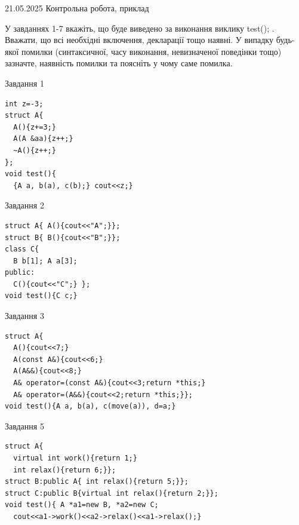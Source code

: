 \documentclass[12pt, ukrainian]{article}
\begin{document}
{{21.05.2025 Контрольна робота, приклад } \par}
{
У завданнях 1-7 вкажіть, що буде виведено за виконання виклику test(); . 
    Вважати, що всі необхідні включення, декларації тощо наявні. 
    У випадку будь-якої помилки (синтаксичної, часу виконання, невизначеної поведінки тощо) зазначте, наявність помилки та поясніть у чому саме помилка.
\begin{minipage}[t]{11cm}
               
{\begin{center}Завдання {1}\end{center}}
\vspace{-6mm}

\begin{verbatim}
int z=-3;
struct A{
  A(){z+=3;}
  A(A &aa){z++;}
  ~A(){z++;}
};
void test(){
  {A a, b(a), c(b);} cout<<z;}
\end{verbatim}            


               
{\begin{center}Завдання {2}\end{center}}
\vspace{-6mm}

\begin{verbatim}
struct A{ A(){cout<<"A";}};
struct B{ B(){cout<<"B";}};
class C{
  B b[1]; A a[3];
public:
  C(){cout<<"C";} };
void test(){C c;}
\end{verbatim}            


               
{\begin{center}Завдання {3}\end{center}}
\vspace{-6mm}

\begin{verbatim}
struct A{
  A(){cout<<7;}
  A(const A&){cout<<6;}
  A(A&&){cout<<8;}
  A& operator=(const A&){cout<<3;return *this;}
  A& operator=(A&&){cout<<2;return *this;}};
void test(){A a, b(a), c(move(a)), d=a;}
\end{verbatim}            


               
{\begin{center}Завдання {5}\end{center}}
\vspace{-6mm}

\begin{verbatim}
struct A{
  virtual int work(){return 1;}
  int relax(){return 6;}};
struct B:public A{ int relax(){return 5;}};
struct C:public B{virtual int relax(){return 2;}};
void test(){ A *a1=new B, *a2=new C;
  cout<<a1->work()<<a2->relax()<<a1->relax();}
\end{verbatim}            



\end{minipage}}
\end{document}
